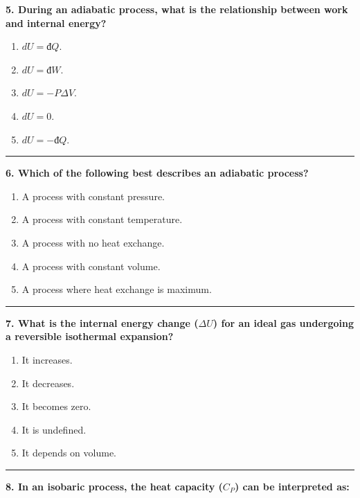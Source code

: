 \documentclass[
  9pt,
]{extbook}
\providecommand{\tightlist}{%
  \setlength{\itemsep}{0pt}\setlength{\parskip}{0pt}}
\theoremstyle{definition}
\theoremstyle{definition}
\theoremstyle{definition}
\theoremstyle{definition}
\theoremstyle{remark}
\begin{document}
\textbf{5. During an adiabatic process, what is the relationship between work and internal energy?}

\begin{enumerate}
\def\labelenumi{\alph{enumi}.}
\tightlist
\item
  \(dU = đQ\).
\item
  \(dU = đW\).
\item
  \(dU = -P \Delta V\).
\item
  \(dU = 0\).
\item
  \(dU = -đQ\).
\end{enumerate}

\begin{center}\rule{0.5\linewidth}{0.5pt}\end{center}

\textbf{6. Which of the following best describes an adiabatic process?}

\begin{enumerate}
\def\labelenumi{\alph{enumi}.}
\tightlist
\item
  A process with constant pressure.
\item
  A process with constant temperature.
\item
  A process with no heat exchange.
\item
  A process with constant volume.
\item
  A process where heat exchange is maximum.
\end{enumerate}

\begin{center}\rule{0.5\linewidth}{0.5pt}\end{center}

\textbf{7. What is the internal energy change (\(\Delta U\)) for an ideal gas undergoing a reversible isothermal expansion?}

\begin{enumerate}
\def\labelenumi{\alph{enumi}.}
\tightlist
\item
  It increases.
\item
  It decreases.
\item
  It becomes zero.
\item
  It is undefined.
\item
  It depends on volume.
\end{enumerate}

\begin{center}\rule{0.5\linewidth}{0.5pt}\end{center}

\textbf{8. In an isobaric process, the heat capacity (\(C_P\)) can be interpreted as:}
\end{document}
